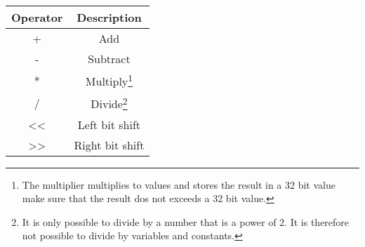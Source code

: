 			\begin{tabular}{c|c}
				\textbf{Operator} & \textbf{Description}\\
				\hline
				+	& Add \\
				- & Subtract \\
				* & Multiply\footnote{The multiplier multiplies to values and stores the result in a 32 bit value make sure that the result dos not exceeds a 32 bit value.} \\
				/ & Divide\footnote{It is only possible to divide by a number that is a power of 2. It is therefore not possible to divide by variables and constants.} \\
				<< & Left bit shift \\
				>> & Right bit shift
			\end{tabular}